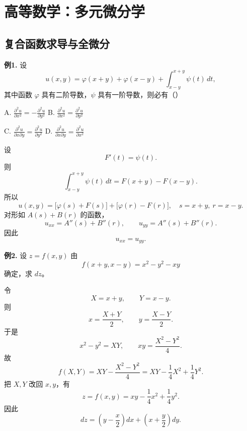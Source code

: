 \chapter{高等数学：多元微分学}

\section{复合函数求导与全微分}

\begin{problemblock}
\textbf{例1.} 设
\[
u(x,y)=\varphi(x+y)+\varphi(x-y)+\int_{x-y}^{x+y}\psi(t)\,dt,
\]
其中函数 \(\varphi\) 具有二阶导数，\(\psi\) 具有一阶导数，则必有（\quad）

A. \(\displaystyle \frac{\partial^2u}{\partial x^2}=-\frac{\partial^2u}{\partial y^2}\)
\quad
B. \(\displaystyle \frac{\partial^2u}{\partial x^2}=\frac{\partial^2u}{\partial y^2}\)

C. \(\displaystyle \frac{\partial^2u}{\partial x\partial y}=\frac{\partial^2u}{\partial y^2}\)
\quad
D. \(\displaystyle \frac{\partial^2u}{\partial x\partial y}=\frac{\partial^2u}{\partial x^2}\)
\end{problemblock}
\begin{solutionblock}
设
\[
F'(t)=\psi(t).
\]
则
\[
\int_{x-y}^{x+y}\psi(t)\,dt=F(x+y)-F(x-y).
\]
所以
\[
u(x,y)=\bigl[\varphi(s)+F(s)\bigr]+\bigl[\varphi(r)-F(r)\bigr],
\quad s=x+y,\ r=x-y.
\]
对形如 \(A(s)+B(r)\) 的函数，
\[
u_{xx}=A''(s)+B''(r),\qquad
u_{yy}=A''(s)+B''(r).
\]
因此
\[
u_{xx}=u_{yy}.
\]
\end{solutionblock}

\begin{problemblock}
\textbf{例2.} 设 \(z=f(x,y)\) 由
\[
f(x+y,x-y)=x^2-y^2-xy
\]
确定，求 \(dz\)。
\end{problemblock}
\begin{solutionblock}
令
\[
X=x+y,\qquad Y=x-y.
\]
则
\[
x=\frac{X+Y}{2},\qquad y=\frac{X-Y}{2}.
\]
于是
\[
x^2-y^2=XY,\qquad
xy=\frac{X^2-Y^2}{4}.
\]
故
\[
f(X,Y)=XY-\frac{X^2-Y^2}{4}
=XY-\frac14X^2+\frac14Y^2.
\]
把 \(X,Y\) 改回 \(x,y\)，有
\[
z=f(x,y)=xy-\frac14x^2+\frac14y^2.
\]
因此
\[
dz=\left(y-\frac x2\right)dx+\left(x+\frac y2\right)dy.
\]
\end{solutionblock}

